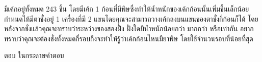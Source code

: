 \question มีเค้กอยู่ทั้งหมด 243 ชิ้น โดยมีเค้ก 1 ก้อนที่มีพิษซึ่งทำให้น้ำหนักของเค้กก้อนนั้นเพิ่มขึ้นเล็กน้อย กำหนดให้มีตาชั่งอยู่ 1 เครื่องที่มี 2 แขนโดยคุณจะสามารถวางเค้กลงบนแขนของตาชั่งกี่ก้อนก็ได้ โดยหลังจากชั่งแล้วคุณจะทราบว่าระหว่างของสองฝั่ง ฝั่งใดมีน้ำหนักน้อยกว่า มากกว่า หรือเท่ากัน อยากทราบว่าคุณจะต้องชั่งทั้งหมดกี่รอบถึงจะทำให้รู้ว่าเค้กก้อนไหนมียาพิษ โดยใช้จำนวนรอบที่น้อยที่สุด

\par\medskip
ตอบ ในกระดาษคำตอบ
